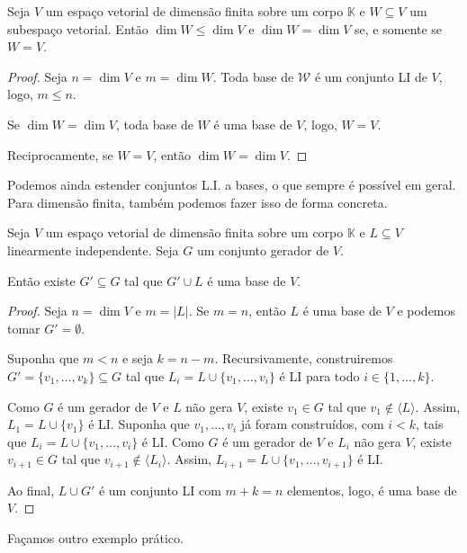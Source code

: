 \begin{proposition}
    Seja $V$ um espaço vetorial de dimensão finita sobre um corpo $\mathbb K$ e $W\subseteq V$ um subespaço vetorial.
    Então $\dim W\leq \dim V$ e $\dim W=\dim V$ se, e somente se $W=V$.
\end{proposition}
\begin{proof}
    Seja $n=\dim V$ e $m=\dim W$.
    Toda base de $\mathcal W$ é um conjunto LI de $V$, logo, $m \leq n$.
    
    Se $\dim W=\dim V$, toda base de $W$ é uma base de $V$, logo, $W=V$.

    Reciprocamente, se $W=V$, então $\dim W=\dim V$.
\end{proof}

Podemos ainda estender conjuntos L.I. a bases, o que sempre é possível em geral.
Para dimensão finita, também podemos fazer isso de forma concreta.

\begin{proposition}
    Seja $V$ um espaço vetorial de dimensão finita sobre um corpo $\mathbb K$ e $L \subseteq V$ linearmente independente.
    Seja $G$ um conjunto gerador de $V$.

    Então existe $G'\subseteq G$ tal que $G'\cup L$ é uma base de $V$.
\end{proposition}
\begin{proof}
    Seja $n=\dim V$ e $m=|L|$. Se $m=n$, então $L$ é uma base de $V$ e podemos tomar $G'=\emptyset$.
    
    Suponha que $m<n$ e seja $k=n-m$.
    Recursivamente, construiremos $G'=\{v_1, \ldots, v_k\} \subseteq G$ tal que $L_i = L \cup \{v_1, \ldots, v_i\}$ é LI para todo $i \in \{1, \ldots, k\}$.

    Como $G$ é um gerador de $V$ e $L$ não gera $V$, existe $v_1 \in G$ tal que $v_1 \notin \langle L \rangle$.
    Assim, $L_1 = L \cup \{v_1\}$ é LI.
    Suponha que $v_1, \ldots, v_i$ já foram construídos, com $i<k$, tais que $L_i = L \cup \{v_1, \ldots, v_i\}$ é LI.
    Como $G$ é um gerador de $V$ e $L_i$ não gera $V$, existe $v_{i+1} \in G$ tal que $v_{i+1} \notin \langle L_i \rangle$.
    Assim, $L_{i+1} = L \cup \{v_1, \ldots, v_{i+1}\}$ é LI.

    Ao final, $L\cup G'$ é um conjunto LI com $m+k=n$ elementos, logo, é uma base de $V$.
\end{proof}

Façamos outro exemplo prático.

